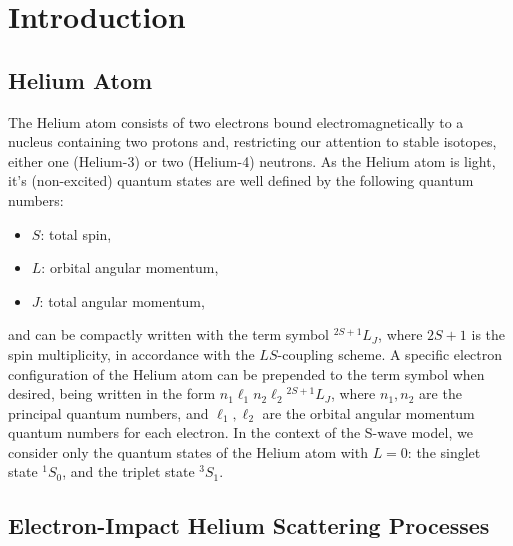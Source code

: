\documentclass[]{article}
\def\mainmatter{%
    \pagenumbering{arabic}
    \setcounter{page}{1}
    \setcounter{section}{0}
    \renewcommand{\thesection}{\arabic{section}}
}%
\begin{document}
\clearpage

\mainmatter

\section{Introduction}
\label{sec:in}


\subsection{Helium Atom}
\label{sec:in-he}


The Helium atom consists of two electrons bound electromagnetically to a nucleus
containing two protons and, restricting our attention to stable isotopes, either
one (Helium-3) or two (Helium-4) neutrons.
As the Helium atom is light, it's (non-excited) quantum states are well defined
by the following quantum numbers:
\begin{itemize}
\item $S$: total spin,
\item $L$: orbital angular momentum,
\item $J$: total angular momentum,
\end{itemize}
and can be compactly written with the term symbol ${}^{2S + 1}L_{J}$, where
$2S + 1$ is the spin multiplicity, in accordance with the $LS$-coupling scheme.
A specific electron configuration of the Helium atom can be prepended to the
term symbol when desired, being written in the form
$n_{1}\ell_{1} n_{2}\ell_{2} {}^{2S + 1}L_{J}$, where $n_{1}, n_{2}$ are the
principal quantum numbers, and $\ell_{1}, \ell_{2}$ are the orbital angular
momentum quantum numbers for each electron.
In the context of the S-wave model, we consider only the quantum states of the
Helium atom with $L = 0$: the singlet state ${}^{1}S_{0}$, and the triplet state
${}^{3}S_{1}$.

\subsection{Electron-Impact Helium Scattering Processes}
\label{sec:in-proc}

\end{document}
